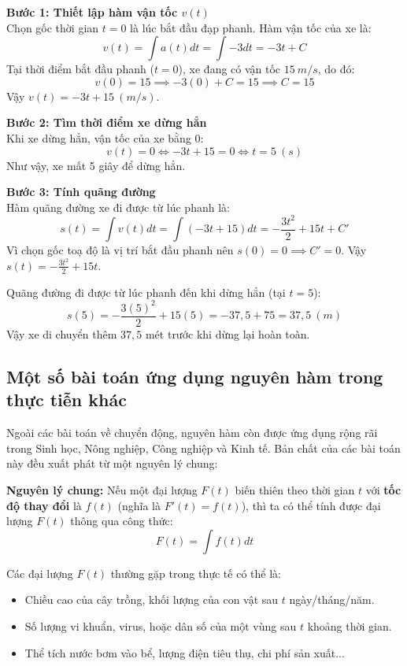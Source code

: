 \documentclass[12pt]{article}
\begin{document}
	\begin{loigiai}
		\textbf{Bước 1: Thiết lập hàm vận tốc $v(t)$} \\
		Chọn gốc thời gian $t=0$ là lúc bắt đầu đạp phanh. 
		Hàm vận tốc của xe là:
		$$v(t) = \int a(t)dt = \int -3 dt = -3t + C$$
		Tại thời điểm bắt đầu phanh ($t=0$), xe đang có vận tốc $15 \ m/s$, do đó:
		$$v(0) = 15 \implies -3(0) + C = 15 \implies C = 15$$
		Vậy $v(t) = -3t + 15 \ (m/s)$.
		
		\textbf{Bước 2: Tìm thời điểm xe dừng hẳn} \\
		Khi xe dừng hẳn, vận tốc của xe bằng $0$:
		$$v(t) = 0 \iff -3t + 15 = 0 \iff t = 5 \ (s)$$
		Như vậy, xe mất 5 giây để dừng hẳn.
		
		\textbf{Bước 3: Tính quãng đường} \\
		Hàm quãng đường xe đi được từ lúc phanh là:
		$$s(t) = \int v(t)dt = \int (-3t + 15)dt = -\frac{3t^2}{2} + 15t + C'$$
		Vì chọn gốc toạ độ là vị trí bắt đầu phanh nên $s(0) = 0 \implies C' = 0$.
		Vậy $s(t) = -\frac{3t^2}{2} + 15t$.
		
		Quãng đường đi được từ lúc phanh đến khi dừng hẳn (tại $t=5$):
		$$s(5) = -\frac{3(5)^2}{2} + 15(5) = -37,5 + 75 = 37,5 \ (m)$$
		Vậy xe di chuyển thêm $37,5$ mét trước khi dừng lại hoàn toàn.
	\end{loigiai}
	
	\vspace{5cm} %
	
	\subsection{Một số bài toán ứng dụng nguyên hàm trong thực tiễn khác}
	
	Ngoài các bài toán về chuyển động, nguyên hàm còn được ứng dụng rộng rãi trong Sinh học, Nông nghiệp, Công nghiệp và Kinh tế. Bản chất của các bài toán này đều xuất phát từ một nguyên lý chung:
	
	\begin{tcolorbox}[colback=blue!5!white, colframe=blue!75!black, rounded corners, boxrule=1pt]
		\textbf{Nguyên lý chung:} Nếu một đại lượng $F(t)$ biến thiên theo thời gian $t$ với \textbf{tốc độ thay đổi} là $f(t)$ (nghĩa là $F'(t) = f(t)$), thì ta có thể tính được đại lượng $F(t)$ thông qua công thức:
		$$F(t) = \int f(t)dt$$
	\end{tcolorbox}
	
	Các đại lượng $F(t)$ thường gặp trong thực tế có thể là:
	\begin{itemize}
		\item Chiều cao của cây trồng, khối lượng của con vật sau $t$ ngày/tháng/năm.
		\item Số lượng vi khuẩn, virus, hoặc dân số của một vùng sau $t$ khoảng thời gian.
		\item Thể tích nước bơm vào bể, lượng điện tiêu thụ, chi phí sản xuất...
	\end{itemize}
	
\end{document}
